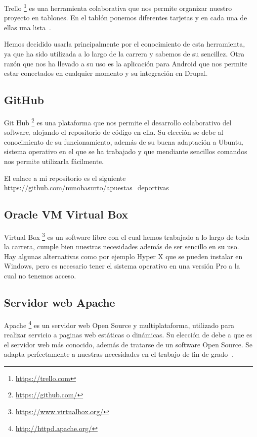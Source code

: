 Trello \footnote{\url{https://trello.com}} es una herramienta colaborativa que nos permite organizar nuestro  proyecto en tablones. En el tablón ponemos diferentes tarjetas y en cada una de ellas una lista~\cite{trello}.

Hemos decidido usarla principalmente por el conocimiento de esta herramienta, ya que ha sido utilizada a lo largo de la carrera y sabemos de su sencillez. Otra razón que nos ha llevado a su uso es la aplicación para Android que nos permite estar  conectados en cualquier momento y su integración en Drupal.

\subsection{GitHub}
Git Hub \footnote{\url{https://github.com/}} es una plataforma que nos permite el desarrollo colaborativo del software, alojando el repositorio de código en ella.
Su elección se debe al conocimiento de su funcionamiento, además de su buena adaptación a Ubuntu, sistema operativo en el que se ha trabajado y que mendiante sencillos comandos nos permite utilizarla fácilmente. 

El enlace a mi repositorio es el siguiente \url{https://github.com/nunobasurto/apuestas_deportivas}

\subsection{Oracle VM Virtual Box}
Virtual Box \footnote{\url{https://www.virtualbox.org/}} es un software libre con el cual hemos trabajado a lo largo de toda la carrera, cumple bien nuestras necesidades además de ser sencillo en su uso. Hay algunas alternativas como por ejemplo Hyper X que se pueden instalar en Windows, pero es necesario tener el sistema operativo en una versión Pro a la cual no tenemos acceso.

\subsection{Servidor web Apache}
Apache \footnote{\url{http://httpd.apache.org/}} es un servidor web Open Source y multiplataforma, utilizado para realizar servicio a paginas web estáticas o dinámicas.
Su elección de debe a que es el servidor web más conocido, además de tratarse de un software Open Source. Se adapta perfectamente a nuestras necesidades en el trabajo de fin de grado~\cite{wiki:apache}.


